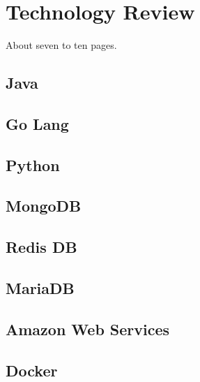 
\chapter{Technology Review}
About seven to ten pages.





\section {Java}
\section {Go Lang}
\section {Python}
\section {MongoDB}
\section {Redis DB}
\section {MariaDB}
\section {Amazon Web Services}
\section {Docker}